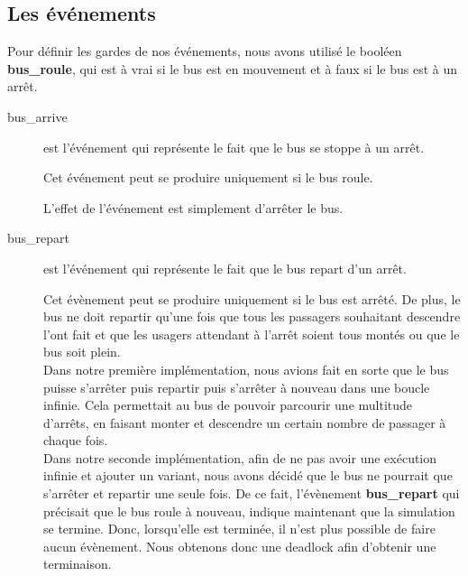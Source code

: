 \documentclass[a4paper,titlepage]{report}
\begin{document}
	\subsection{Les événements}
		Pour définir les gardes de nos événements, nous avons utilisé le booléen \textbf{bus\_roule}, qui est à vrai si le bus est en mouvement et à faux si le bus est à un arrêt.\\
		
		\begin{description}
			\item[bus\_arrive] est l'événement qui représente le fait que le bus se stoppe à un arrêt.
			
			Cet événement peut se produire uniquement si le bus roule. 
			
			L'effet de l'événement est simplement d'arrêter le bus.\\
		
			\item[bus\_repart] est l'événement qui représente le fait que le bus repart d'un arrêt.
			
			Cet évènement peut se produire uniquement si le bus est arrêté. De plus, le bus ne doit repartir qu'une fois que tous les passagers souhaitant descendre l'ont fait et que les usagers attendant à l'arrêt soient tous montés ou que le bus soit plein. \\
			
			Dans notre première implémentation, nous avions fait en sorte que le bus puisse s'arrêter puis repartir puis s'arrêter à nouveau dans une boucle infinie. Cela permettait au bus de pouvoir parcourir une multitude d'arrêts, en faisant monter et descendre un certain nombre de passager à chaque fois.\\
			
			Dans notre seconde implémentation, afin de ne pas avoir une exécution infinie et ajouter un variant, nous avons décidé que le bus ne pourrait que s'arrêter et repartir une seule fois. De ce fait, l'évènement \textbf{bus\_repart} qui précisait que le bus roule à nouveau, indique maintenant que la simulation se termine. Donc, lorsqu'elle est terminée, il n'est plus possible de faire aucun évènement. Nous obtenons donc une deadlock afin d'obtenir une terminaison.
			



\end{description}
\end{document}
